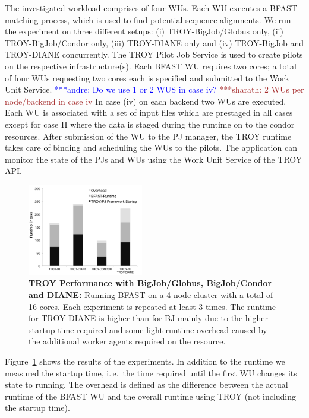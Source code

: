 \documentclass[conference,final]{IEEEtran}
\newcommand{\alnote}[1]{ {\textcolor{blue} { ***andre: #1 }}}
\newcommand{\smnote}[1]{ {\textcolor{brown} { ***sharath: #1 }}}
\newcommand{\alnote}[1]{}
\newcommand{\smnote}[1]{}
\newcommand{\up}{\vspace*{-1em}}
\begin{document}
The investigated workload comprises of four WUs. Each WU executes a BFAST
matching process, which is used to find potential sequence alignments. We run
the experiment on three different setups: (i) TROY-BigJob/Globus only, (ii)
TROY-BigJob/Condor only, (iii) TROY-DIANE only and (iv) TROY-BigJob and
TROY-DIANE concurrently. The TROY Pilot Job Service is used to create pilots on
the respective infrastructure(s). Each BFAST WU requires two cores; a total of
four WUs requesting two cores each is specified and submitted to the Work Unit
Service. 
\alnote{Do we use 1 or 2 WUS in case iv?}   
\smnote{2 WUs per node/backend in case iv }
 In case (iv) on each backend two WUs are executed. 
 Each WU is associated with a set of input files which are prestaged in 
 all cases except  for case II where the data is staged during the runtime on
 to the condor resources. After
submission of the WU to the PJ manager, the TROY runtime takes care of binding
and scheduling the WUs to the pilots. The application can monitor the state of
the PJs and WUs using the Work Unit Service of the TROY API.

\begin{figure}[t]
	\centering
		\includegraphics[width=0.45\textwidth]{figures/NewTROYData.pdf}
	\caption{\textbf{TROY Performance with BigJob/Globus, BigJob/Condor and 
	DIANE:} Running BFAST on a 4 node cluster with a total of 16 cores. Each 
	experiment is repeated at least 3 times. The runtime for TROY-DIANE is 
	higher than for BJ mainly due to the higher startup time required and some 
	light runtime overhead caused by the additional worker agents required on 
	the resource.\up\up}

	\label{fig:perf_perf-bfast-bj}
\end{figure}

Figure~\ref{fig:perf_perf-bfast-bj} shows the results of the experiments. In 
addition to the runtime we measured the startup time, i.\,e.\ the time required 
until the first WU changes its state to running. The overhead is defined as the 
difference between the actual runtime of the BFAST WU and the overall runtime 
using TROY (not including the startup time).
\end{document}
